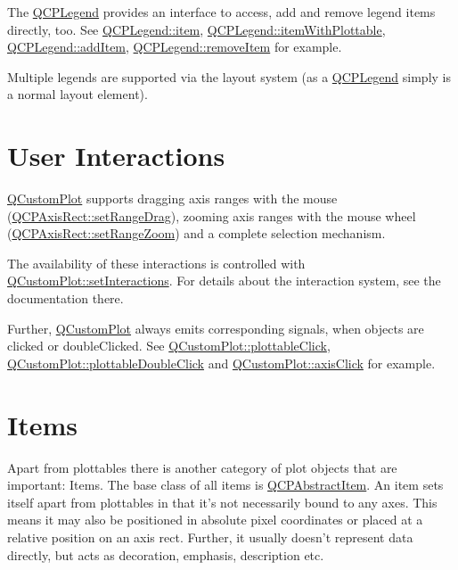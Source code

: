 The \hyperlink{class_q_c_p_legend}{Q\-C\-P\-Legend} provides an interface to access, add and remove legend items directly, too. See \hyperlink{class_q_c_p_legend_a454272d7094437beb3278a2294006da5}{Q\-C\-P\-Legend\-::item}, \hyperlink{class_q_c_p_legend_a5ee80cf83f65e3b6dd386942ee3cc1ee}{Q\-C\-P\-Legend\-::item\-With\-Plottable}, \hyperlink{class_q_c_p_legend_a3ab274de52d2951faea45a6d975e6b3f}{Q\-C\-P\-Legend\-::add\-Item}, \hyperlink{class_q_c_p_legend_ac91595c3eaa746fe6321d2eb952c63bb}{Q\-C\-P\-Legend\-::remove\-Item} for example.

Multiple legends are supported via the layout system (as a \hyperlink{class_q_c_p_legend}{Q\-C\-P\-Legend} simply is a normal layout element).\hypertarget{index_mainpage-userinteraction}{}\section{User Interactions}\label{index_mainpage-userinteraction}
\hyperlink{class_q_custom_plot}{Q\-Custom\-Plot} supports dragging axis ranges with the mouse (\hyperlink{class_q_c_p_axis_rect_ae6aef2f7211ba6097c925dcd26008418}{Q\-C\-P\-Axis\-Rect\-::set\-Range\-Drag}), zooming axis ranges with the mouse wheel (\hyperlink{class_q_c_p_axis_rect_a7960a9d222f1c31d558b064b60f86a31}{Q\-C\-P\-Axis\-Rect\-::set\-Range\-Zoom}) and a complete selection mechanism.

The availability of these interactions is controlled with \hyperlink{class_q_custom_plot_a5ee1e2f6ae27419deca53e75907c27e5}{Q\-Custom\-Plot\-::set\-Interactions}. For details about the interaction system, see the documentation there.

Further, \hyperlink{class_q_custom_plot}{Q\-Custom\-Plot} always emits corresponding signals, when objects are clicked or double\-Clicked. See \hyperlink{class_q_custom_plot_a57e5efa8a854620e9bf62d31fc139f53}{Q\-Custom\-Plot\-::plottable\-Click}, \hyperlink{class_q_custom_plot_af2e6f1cea923dae437681d01ce7d0c31}{Q\-Custom\-Plot\-::plottable\-Double\-Click} and \hyperlink{class_q_custom_plot_abf635f8b56ab5c16d5de9f358543e82b}{Q\-Custom\-Plot\-::axis\-Click} for example.\hypertarget{index_mainpage-items}{}\section{Items}\label{index_mainpage-items}
Apart from plottables there is another category of plot objects that are important\-: Items. The base class of all items is \hyperlink{class_q_c_p_abstract_item}{Q\-C\-P\-Abstract\-Item}. An item sets itself apart from plottables in that it's not necessarily bound to any axes. This means it may also be positioned in absolute pixel coordinates or placed at a relative position on an axis rect. Further, it usually doesn't represent data directly, but acts as decoration, emphasis, description etc.

